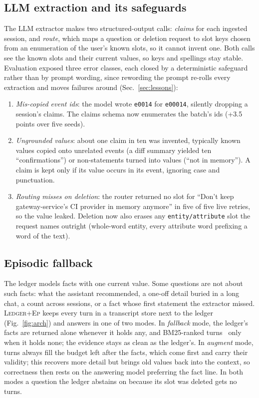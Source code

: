 \documentclass[10pt,conference]{IEEEtran}
\newcommand{\hyb}{\textsc{Ledger+Ep}}
\begin{document}
\subsection{LLM extraction and its safeguards}
\label{sec:extraction}

The LLM extractor makes two structured-output calls: \emph{claims} for each
ingested session, and \emph{route}, which maps a question or deletion request
to slot keys chosen from an enumeration of the user's known slots, so it
cannot invent one. Both calls see the known slots and their current values, so
keys and spellings stay stable. Evaluation exposed three error classes, each
closed by a deterministic safeguard rather than by prompt wording, since
rewording the prompt re-rolls every extraction and moves failures around
(Sec.~\ref{sec:lessons}):
\begin{enumerate}
\item \emph{Mis-copied event ids}: the model wrote \texttt{e0014} for
  \texttt{e00014}, silently dropping a session's claims. The claims schema now
  enumerates the batch's ids (+3.5 points over five seeds).
\item \emph{Ungrounded values}: about one claim in ten was invented, typically
  known values copied onto unrelated events (a diff summary yielded ten
  ``confirmations'') or non-statements turned into values (``not in
  memory''). A claim is kept only if its value occurs in its event, ignoring
  case and punctuation.
\item \emph{Routing misses on deletion}: the router returned no slot for
  ``Don't keep gateway-service's CI provider in memory anymore'' in five of
  five live retries, so the value leaked. Deletion now also erases any
  \texttt{entity/attribute} slot the request names outright (whole-word
  entity, every attribute word prefixing a word of the text).
\end{enumerate}

\subsection{Episodic fallback}
\label{sec:hybrid}

The ledger models facts with one current value. Some questions are not about
such facts: what the assistant recommended, a one-off detail buried in a long
chat, a count across sessions, or a fact whose first statement the extractor
missed. \hyb{} keeps every turn in a transcript store next to the ledger
(Fig.~\ref{fig:arch}) and answers in one of two modes. In \emph{fallback}
mode, the ledger's facts are returned alone whenever it holds any, and
BM25-ranked turns~\cite{robertson2009bm25} only when it holds none; the
evidence stays as clean as the ledger's. In \emph{augment} mode, turns always
fill the budget left after the facts, which come first and carry their
validity; this recovers more detail but brings old values back into the
context, so correctness then rests on the answering model preferring the fact
line. In both modes a question the ledger abstains on because its slot was
deleted gets no turns.
\end{document}
